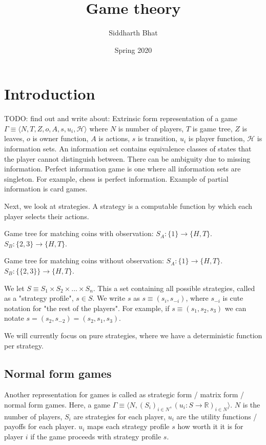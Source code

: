 \documentclass[11pt]{book}
\title{Game theory}
\author{Siddharth Bhat}
\date{Spring 2020}
\newcommand{\R}{\ensuremath{\mathbb R}}
\begin{document}
\maketitle
\tableofcontents

\chapter{Introduction}


TODO: find out and write about: 
Extrinsic form representation of a game
$\Gamma \equiv \langle N, T, Z, o, A, s, u_i, \mathcal{H}\rangle$
where $N$ is number of players, $T$ is game tree, $Z$ is leaves, $o$ is owner
function, $A$ is actions, $s$ is transition, $u_i$ is player function, $\mathcal H$
is information sets. An information set contains equivalence classes
of states that the player cannot distinguish between. There can be ambiguity
due to missing information. Perfect information game is one where all
information sets are singleton. For example, chess is perfect information.
Example of partial information is card games.

Next, we look at strategies. A strategy is a computable function by which
each player selects their actions.

Game tree for matching coins with observation:
$S_A: \{ 1 \} \rightarrow \{H, T\}$. $S_B: \{2, 3\} \rightarrow \{H, T \}$.


Game tree for matching coins without observation:
$S_A: \{ 1 \} \rightarrow \{H, T\}$. $S_B: \{\{2, 3\}\} \rightarrow \{H, T \}$.

We let $S \equiv S_1 \times S_2 \times \dots \times S_n$. This a set containing
all possible strategies, called as a "strategy profile", $s \in S$. We
write $s$ as $s \equiv (s_i, s_{-i})$, where $s_{-i}$ is cute notation for
"the rest of the players". For example, if $s \equiv (s_1, s_2, s_3)$ we can 
notate $s = (s_2, s_{-2}) = (s_2, s_1, s_3)$.

We will currently focus on pure strategies, where we have a deterministic
function per strategy.


\section{Normal form games}
Another representation for games is called as strategic form / matrix form / 
normal form games.  Here, a game $\Gamma \equiv \langle N, (S_i)_{i \in N}, (u_i: S \rightarrow \R)_{i \in N} \rangle$.
$N$ is the number of players, $S_i$ are strategies for each player, $u_i$ 
are the utility functions / payoffs for each player. $u_i$ maps each
strategy profile $s$ how worth it it is for player $i$ if
the game proceeds with strategy profile $s$.
\end{document}
